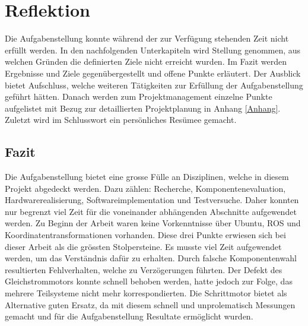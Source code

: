 \chapter{Reflektion}
\label{chap:Reflektion}

Die Aufgabenstellung konnte während der zur Verfügung stehenden Zeit nicht erfüllt werden. In den nachfolgenden Unterkapiteln wird Stellung genommen, aus welchen Gründen die definierten Ziele nicht erreicht wurden. Im Fazit werden Ergebnisse und Ziele gegenübergestellt und offene Punkte erläutert. Der Ausblick bietet Aufschluss, welche weiteren Tätigkeiten zur Erfüllung der Aufgabenstellung geführt hätten. Danach werden zum Projektmanagement einzelne Punkte aufgelistet mit Bezug zur detaillierten Projektplanung in Anhang \ref{Anhang}.  Zuletzt wird im Schlusswort ein persönliches Resümee gemacht.

\section{Fazit}
\label{sec:Ref_Fazit}
Die Aufgabenstellung bietet eine grosse Fülle an Disziplinen, welche in diesem Projekt abgedeckt werden. Dazu zählen: Recherche, Komponentenevaluation, Hardwarerealisierung, Softwareimplementation und Testversuche. Daher konnten nur begrenzt viel Zeit für die voneinander abhängenden Abschnitte aufgewendet werden. Zu Beginn der Arbeit waren keine Vorkenntnisse über Ubuntu, ROS und Koordinatentransformationen vorhanden. Diese drei Punkte erwiesen sich bei dieser Arbeit als die grössten Stolpersteine. Es musste viel Zeit aufgewendet werden, um  das Verständnis dafür zu erhalten. 
Durch falsche Komponentenwahl resultierten Fehlverhalten, welche zu Verzögerungen führten. Der Defekt des Gleichstrommotors konnte schnell behoben werden, hatte jedoch zur Folge, das mehrere Teilsysteme nicht mehr  korrespondierten. Die Schrittmotor bietet als Alternative guten Ersatz, da mit diesem schnell und unprolematisch Messungen gemacht und für die Aufgabenstellung Resultate ermöglicht wurden.

